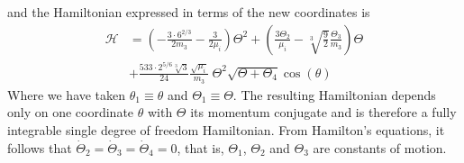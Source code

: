 \documentclass[ twoside,openright,titlepage,numbers=noenddot,headinclude,%
                footinclude=true,cleardoublepage=empty,abstractoff, %
                BCOR=5mm,paper=a4,fontsize=11pt,%
                american,%
                ]{scrreprt}
\begin{document}
and the Hamiltonian expressed in terms of the new coordinates is 
\begin{equation}
    \begin{aligned}
        \mathcal{H}&=\left(- \frac{3\cdot 6^{2/3}}{2m_3} - \frac{3}{2\mu_i} 
        \right)\Theta^2+
        \left(\frac{3\Theta_2 }{\mu_i}
          -\sqrt[3]{\frac{9}{2}}\frac{\Theta_3}{m_3}
        \right)\Theta\\ 
        &+ \frac{533\cdot 2^{5/6}\sqrt[3]{3}}{24} 
        \frac{\sqrt{\mu_i}}{m_3}\;  \Theta^2\sqrt{\Theta+\Theta_4}\cos(\theta)
    \end{aligned}
    \label{eq:hamiltonian_sdof_full}
\end{equation}
Where we have taken $\theta_1\equiv\theta$ and $\Theta_1\equiv\Theta$.
The resulting Hamiltonian depends only on one coordinate $\theta$ with
$\Theta$ its momentum conjugate and 
is therefore a fully integrable single degree of freedom Hamiltonian. 
From Hamilton's equations, it follows that 
$\dot{\Theta}_2=\dot{\Theta}_3=\dot{\Theta}_4=0$, that is, $\Theta_1$,
$\Theta_2$  and $\Theta_3$ are constants of motion. 
\end{document}
